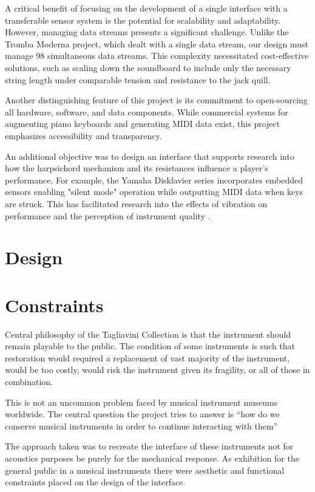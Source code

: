 A critical benefit of focusing on the development of a single interface with a transferable sensor system is the potential for scalability and adaptability. However, managing data streams presents a significant challenge. Unlike the Tromba Moderna project, which dealt with a single data stream, our design must manage 98 simultaneous data streams. This complexity necessitated cost-effective solutions, such as scaling down the soundboard to include only the necessary string length under comparable tension and resistance to the jack quill.

Another distinguishing feature of this project is its commitment to open-sourcing all hardware, software, and data components. While commercial systems for augmenting piano keyboards and generating MIDI data exist, this project emphasizes accessibility and transparency.

An additional objective was to design an interface that supports research into how the harpsichord mechanism and its resistances influence a player’s performance. For example, the Yamaha Disklavier series incorporates embedded sensors enabling "silent mode" operation while outputting MIDI data when keys are struck. This has facilitated research into the effects of vibration on performance \cite{MusicalHaptics2018_04, MusicalHaptics2018_13} and the perception of instrument quality \cite{MusicalHaptics2018_05}.

\section{Design}


\section{Constraints}\label{design-problem}

Central philosophy of the Tagliavini Collection is that the instrument
should remain playable to the public. The condition of some instruments
is such that restoration would required a replacement of vast majority
of the instrument, would be too costly, would risk the instrument given
its fragility, or all of those in combination.

This is not an uncommon problem faced by musical instrument museums
worldwide. The central question the project tries to answer is ``how do
we conserve musical instruments in order to continue interacting with
them''

The approach taken was to recreate the interface of these instruments
not for acoustics purposes be purely for the mechanical response. As
exhibition for the general public in a musical instruments there were
aesthetic and functional constraints placed on the design of the
interface.

